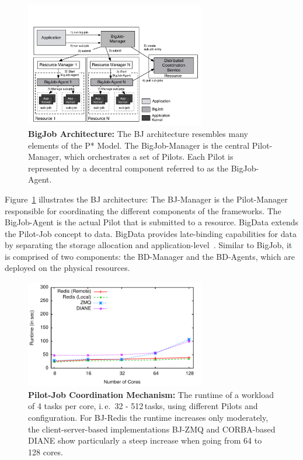 \documentclass[]{paper}
\begin{document}
\begin{figure}[t]
	\centering
	\includegraphics[width=0.7\textwidth]{figures/re_bigjob_interactions.pdf}
	\caption{\textbf{BigJob Architecture:} The
	          BJ architecture resembles many elements of the P* Model. The
	          BigJob-Manager is the central Pilot-Manager, which
	          orchestrates a set of Pilots. Each Pilot is represented by a
	          decentral component referred to as the BigJob-Agent.}
			\label{fig:figures_re_bigjob_interactions}
\end{figure}

Figure~\ref{fig:figures_re_bigjob_interactions} illustrates the BJ
architecture: The BJ-Manager is the Pilot-Manager responsible for coordinating
the different components of the frameworks. The BigJob-Agent is the actual
Pilot that is submitted to a resource. BigData extends the Pilot-Job concept
to data. BigData provides late-binding capabilities for data by separating the
storage allocation and application-level~\cite{pstar-2012}. Similar to BigJob,
it is comprised of two components: the BD-Manager and the BD-Agents, which are
deployed on the physical resources.

\begin{figure}
	\centering
\includegraphics[width=0.7\textwidth]{figures/bigjob-varying-cores-alamo-noadvert.pdf}
\caption{\textbf{Pilot-Job Coordination Mechanism:}  The runtime of a
workload of 4 tasks per core, i.\,e.\ 32 - 512\,tasks, using different Pilots
and configuration. For BJ-Redis the runtime  increases only moderately, the
client-server-based implementations BJ-ZMQ and CORBA-based DIANE show
particularly a steep increase when going from 64 to 128 cores.}
\label{fig:perf_bigjob-varying-cores}
\end{figure}
\end{document}

